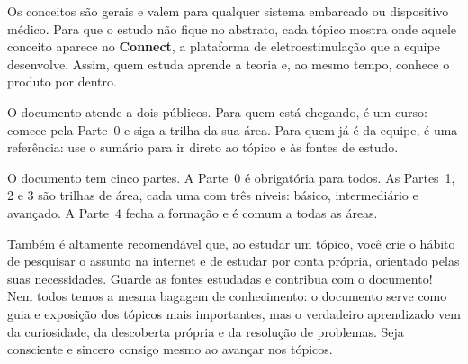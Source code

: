 \documentclass{nro-apostila}
\begin{document}
Os conceitos são gerais e valem para qualquer sistema embarcado ou dispositivo médico. Para que o estudo não fique no abstrato, cada tópico mostra onde aquele conceito aparece no \textbf{Connect}, a plataforma de eletroestimulação que a equipe desenvolve. Assim, quem estuda aprende a teoria e, ao mesmo tempo, conhece o produto por dentro.

O documento atende a dois públicos. Para quem está chegando, é um curso: comece pela Parte~0 e siga a trilha da sua área. Para quem já é da equipe, é uma referência: use o sumário para ir direto ao tópico e às fontes de estudo.

\begin{estatisticas}[4]
\end{estatisticas}

\begin{cartoes}[2]
\end{cartoes}

O documento tem cinco partes. A Parte~0 é obrigatória para todos. As Partes~1, 2 e 3 são trilhas de área, cada uma com três níveis: básico, intermediário e avançado. A Parte~4 fecha a formação e é comum a todas as áreas.

Também é altamente recomendável que, ao estudar um tópico, você crie o hábito de pesquisar o assunto na internet e de estudar por conta própria, orientado pelas suas necessidades. Guarde as fontes estudadas e contribua com o documento! Nem todos temos a mesma bagagem de conhecimento: o documento serve como guia e exposição dos tópicos mais importantes, mas o verdadeiro aprendizado vem da curiosidade, da descoberta própria e da resolução de problemas. Seja consciente e sincero consigo mesmo ao avançar nos tópicos.
\end{document}
